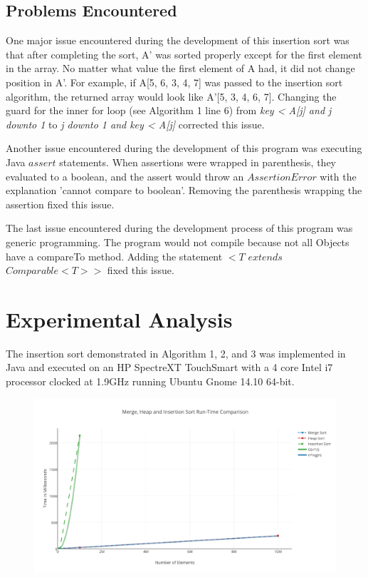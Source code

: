 \documentclass[onecolumn, 12pt, article]{IEEEtran}
\numberwithin{case}{problem}
\numberwithin{condition}{problem}
\numberwithin{condition}{subsection}
\numberwithin{definition}{section}
\theoremstyle{remark}
\numberwithin{question}{problem}
\theoremstyle{plain}
\numberwithin{answer}{problem}
\numberwithin{solution}{section}
\numberwithin{equation}{section}%
\begin{document}
\subsection{Problems Encountered}
One major issue encountered during the development of this insertion sort was that after completing the sort, A' was sorted properly except for the first element in the array. No matter what value the first element of A had, it did not change position in A'. For example, if A[5, 6, 3, 4, 7] was passed to the insertion sort algorithm, the returned array would look like A'[5, 3, 4, 6, 7]. Changing the guard for the inner for loop (see Algorithm 1 line 6) from \textit{key < A[j] and j downto 1} to \textit{j downto 1 and key < A[j]} corrected this issue.

Another issue encountered during the development of this program was executing Java $assert$ statements. When assertions were wrapped in parenthesis, they evaluated to a boolean, and the assert would throw an $AssertionError$ with the explanation 'cannot compare to boolean'. Removing the parenthesis wrapping the assertion fixed this issue.

The last issue encountered during the development process of this program was generic programming. The program would not compile because not all Objects have a compareTo method. Adding the statement $<T$ $extends$ $Comparable<T>>$ fixed this issue. \cite{erik}

\section{Experimental Analysis}
The insertion sort demonstrated in Algorithm 1, 2, and 3 was implemented in Java and executed on an HP SpectreXT TouchSmart with a 4 core Intel i7 processor clocked at 1.9GHz running Ubuntu Gnome 14.10 64-bit.
 \begin{figure}[!]
\begin{center}
\includegraphics[scale=.70]{test-results.pdf}
\end{center}
\label{fig:comparisonfig}
\end{figure}
\end{document}

